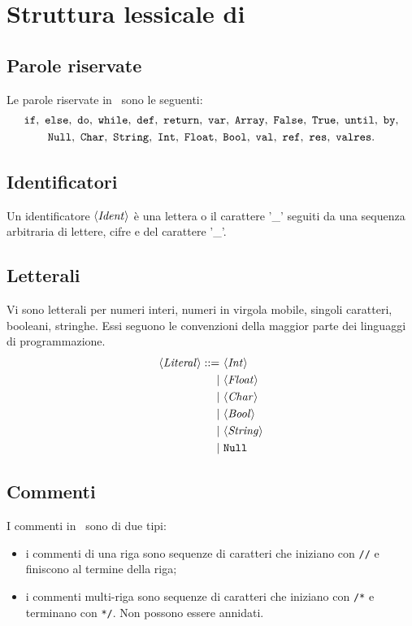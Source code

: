 \section{Struttura lessicale di \SBF}

\subsection*{Parole riservate}
Le parole riservate in \SBF\ sono le seguenti:
\begin{gather*}
\If,\ \Else,\ \Do,\ \While,\ \Def,\ \Return,\ \Var,\ \texttt{Array},\ \False,\ \True,\ \texttt{until},\ \texttt{by},\\
 \texttt{Null},\ \texttt{Char},\ \texttt{String},\ \texttt{Int},\ \texttt{Float},\ \texttt{Bool},\ \texttt{val},\ \texttt{ref},\ \texttt{res},\ \texttt{valres}.
\end{gather*}

\subsection*{Identificatori}

Un identificatore $\langle \mathit{Ident} \rangle$ è una lettera o il carattere '\_' seguiti da una sequenza arbitraria di lettere, cifre e del carattere '\_'.

\subsection*{Letterali}
Vi sono letterali per numeri interi, numeri in virgola mobile, singoli caratteri, booleani, stringhe. Essi seguono le convenzioni della maggior parte dei linguaggi di programmazione.
\begin{align*}
\token{Literal} ::=\ 
& \token{Int}\\
|\ & \token{Float}\\
|\ & \token{Char}\\
|\ & \token{Bool}\\
|\ & \token{String}\\
|\ & \texttt{Null}
\end{align*}

\subsection*{Commenti}
I commenti in \SBF\ sono di due tipi:
\begin{itemize}
	\item i commenti di una riga sono sequenze di caratteri che iniziano con \verb$//$ e finiscono al termine della riga;
	\item i commenti multi-riga sono sequenze di caratteri che iniziano con \verb$/*$ e terminano con \verb$*/$. Non possono essere annidati.
\end{itemize}

